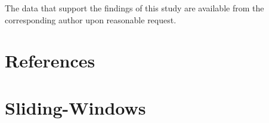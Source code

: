 \documentclass[aip%
 aip,
 amsmath,amssymb,
 reprint,%
]{revtex4-1}
\begin{document}
The data that support the findings of this study are available from the corresponding author upon reasonable request.

\section*{References}
\newpage

\appendix


\section{Sliding-Windows}
\label{sec:sliding_appendix}
\end{document}
